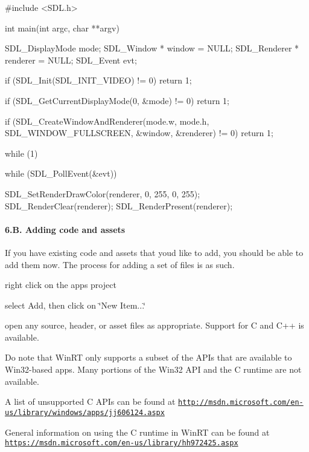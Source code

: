 \begin{DoxyVerb}#include <SDL.h>

int main(int argc, char **argv)
{
    SDL_DisplayMode mode;
    SDL_Window * window = NULL;
    SDL_Renderer * renderer = NULL;
    SDL_Event evt;

    if (SDL_Init(SDL_INIT_VIDEO) != 0) {
        return 1;
    }

    if (SDL_GetCurrentDisplayMode(0, &mode) != 0) {
        return 1;
    }

    if (SDL_CreateWindowAndRenderer(mode.w, mode.h, SDL_WINDOW_FULLSCREEN, &window, &renderer) != 0) {
        return 1;
    }

    while (1) {
        while (SDL_PollEvent(&evt)) {
        }

        SDL_SetRenderDrawColor(renderer, 0, 255, 0, 255);
        SDL_RenderClear(renderer);
        SDL_RenderPresent(renderer);
    }
}
\end{DoxyVerb}


\paragraph*{6.\+B. Adding code and assets}

If you have existing code and assets that you\textquotesingle{}d like to add, you should be able to add them now. The process for adding a set of files is as such.


\begin{DoxyEnumerate}
\item right click on the app\textquotesingle{}s project
\item select Add, then click on \char`\"{}\+New Item...\char`\"{}
\item open any source, header, or asset files as appropriate. Support for C and C++ is available.
\end{DoxyEnumerate}

Do note that Win\+RT only supports a subset of the A\+P\+Is that are available to Win32-\/based apps. Many portions of the Win32 A\+PI and the C runtime are not available.

A list of unsupported C A\+P\+Is can be found at \href{http://msdn.microsoft.com/en-us/library/windows/apps/jj606124.aspx}{\tt http\+://msdn.\+microsoft.\+com/en-\/us/library/windows/apps/jj606124.\+aspx}

General information on using the C runtime in Win\+RT can be found at \href{https://msdn.microsoft.com/en-us/library/hh972425.aspx}{\tt https\+://msdn.\+microsoft.\+com/en-\/us/library/hh972425.\+aspx}

